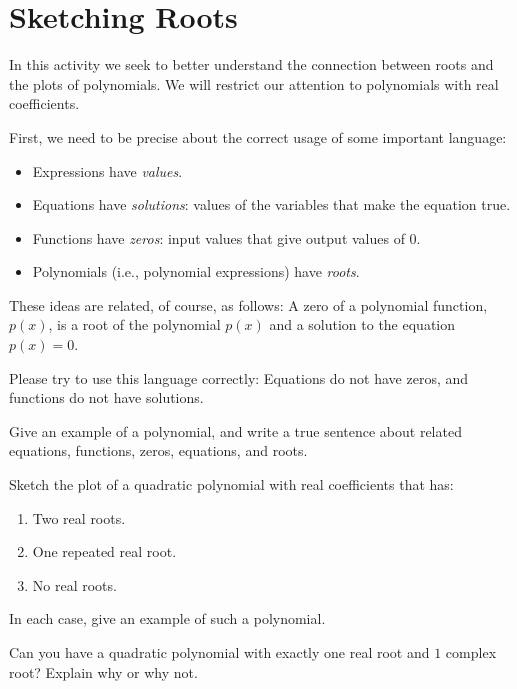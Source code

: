 \newpage
\section{Sketching Roots}\label{A:sketchRoots}

In this activity we seek to better understand the connection between
roots and the plots of polynomials.  We will restrict our attention to polynomials with real coefficients.  

First, we need to be precise about the correct usage of some important language:  

\begin{itemize}
\item Expressions have \emph{values}.  
\item Equations have \emph{solutions}:  values of the variables that make the equation true. 
\item Functions have \emph{zeros}: input values that give output values of 0.
\item Polynomials (i.e., polynomial expressions) have \emph{roots}.  
\end{itemize}
These ideas are related, of course, as follows:  A zero of a polynomial function, $p(x)$, is a root of the polynomial $p(x)$ and a solution to the equation $p(x) = 0$.  

Please try to use this language correctly:  Equations do not have zeros, and functions do not have solutions.  

\begin{prob}
Give an example of a polynomial, and write a true sentence about related equations, functions, zeros, equations, and roots.  
\end{prob}

\begin{prob}
Sketch the plot of a quadratic polynomial with real coefficients that has:
\begin{enumerate}
\item Two real roots.
\item One repeated real root.
\item No real roots.
\end{enumerate}
In each case, give an example of such a polynomial.
\end{prob}

\begin{prob}
Can you have a quadratic polynomial with exactly one real root and
$1$ complex root?  Explain why or why not.
\end{prob}


